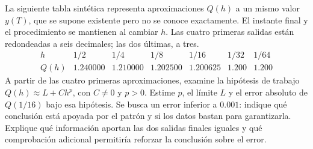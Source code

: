 La siguiente tabla sintética representa aproximaciones \(Q(h)\) a un mismo valor \(y(T)\), que se supone existente pero no se conoce exactamente. El instante final y el procedimiento se mantienen al cambiar \(h\). Las cuatro primeras salidas están redondeadas a seis decimales; las dos últimas, a tres.
\[
\begin{array}{c|rrrrrr}
h&1/2&1/4&1/8&1/16&1/32&1/64\\\hline
Q(h)&1.240000&1.210000&1.202500&1.200625&1.200&1.200
\end{array}
\]
A partir de las cuatro primeras aproximaciones, examine la hipótesis de trabajo \(Q(h)\approx L+Ch^p\), con \(C\ne0\) y \(p>0\). Estime \(p\), el límite \(L\) y el error absoluto de \(Q(1/16)\) bajo esa hipótesis. Se busca un error inferior a \(0.001\): indique qué conclusión está apoyada por el patrón y si los datos bastan para garantizarla. Explique qué información aportan las dos salidas finales iguales y qué comprobación adicional permitiría reforzar la conclusión sobre el error.
